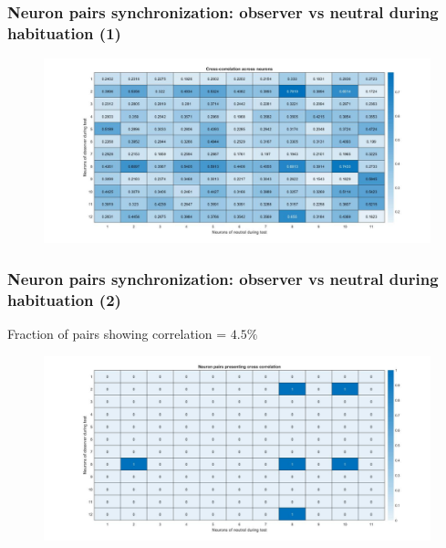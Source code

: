 \documentclass{beamer}
\begin{document}
\begin{frame}
\frametitle{Neuron pairs synchronization: observer vs neutral during habituation (1)}





\begin{figure}[H]
	\begin{center}
		\hspace*{-1cm}
		\includegraphics[scale=.30]{cc_heatmap4.jpg} 
	\end{center}  
	
	
\end{figure}


\end{frame}	




\begin{frame}
\frametitle{Neuron pairs synchronization: observer vs neutral during habituation (2)}


Fraction of pairs showing correlation = $4.5 \%$


\begin{figure}[H]
\begin{center}
	\hspace*{-1cm}
	\includegraphics[scale=.30]{cc_active4.jpg} 
\end{center}  


\end{figure}


\end{frame}
\end{document}
